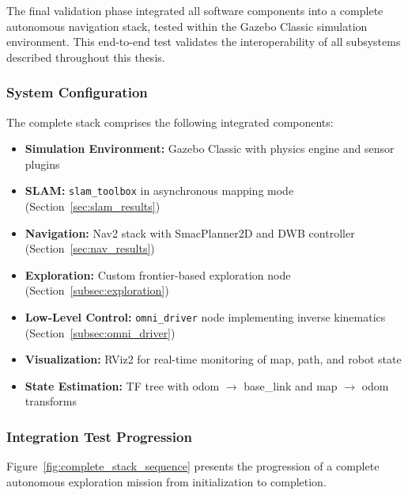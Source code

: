 The final validation phase integrated all software components into a complete autonomous navigation stack, tested within the Gazebo Classic simulation environment. This end-to-end test validates the interoperability of all subsystems described throughout this thesis.

\subsubsection{System Configuration}

The complete stack comprises the following integrated components:

\begin{itemize}
    \item \textbf{Simulation Environment:} Gazebo Classic with physics engine and sensor plugins
    \item \textbf{SLAM:} \texttt{slam\_toolbox} in asynchronous mapping mode (Section~\ref{sec:slam_results})
    \item \textbf{Navigation:} Nav2 stack with SmacPlanner2D and DWB controller (Section~\ref{sec:nav_results})
    \item \textbf{Exploration:} Custom frontier-based exploration node (Section~\ref{subsec:exploration})
    \item \textbf{Low-Level Control:} \texttt{omni\_driver} node implementing inverse kinematics (Section~\ref{subsec:omni_driver})
    \item \textbf{Visualization:} RViz2 for real-time monitoring of map, path, and robot state
    \item \textbf{State Estimation:} TF tree with odom $\rightarrow$ base\_link and map $\rightarrow$ odom transforms
\end{itemize}

\subsubsection{Integration Test Progression}

Figure~\ref{fig:complete_stack_sequence} presents the progression of a complete autonomous exploration mission from initialization to completion.

